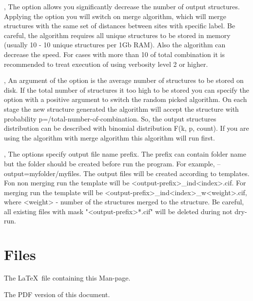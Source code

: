 \documentclass[a4paper,english]{article}
\begin{document}
\begin{Description}
\item[\Opt{-m }, \Opt{--merge-by-distance}]
      The option allows you significantly decrease the number of output structures. Applying the option you will switch on merge algorithm, which will merge structures with the same set of distances between sites with specific label. Be careful, the algorithm requires all unique structures to be stored in memory (usually 10 - 10 unique structures per 1Gb RAM). Also the algorithm can decrease the speed. For cases with more than 10 of  total combination it is recommended to treat execution of  using verbosity level 2 or higher.

\item[\OptArg{-n }{count}, \OptArg{--store-structures=}{count}]
      An argument of the option is the average number of structures to be stored on disk. If the total number of structures it too high to be stored you can specify the option with a positive argument to switch the random picked algorithm. On each stage the new structure generated the algorithm will accept the structure with probability p=/total-number-of-combination. So, the output structures distribution can be described with binomial distribution F(k, p, count). If you are using the algorithm with merge algorithm  this algorithm will run first. 
      
\item[\OptArg{-o }{output-prefix}, \OptArg{--output=}{output-prefix}]
      The options specify output file name prefix. The prefix can contain folder name but the folder should be created before run the program. For example, --output=myfolder/myfiles. The output files will be created according to templates. Fon non merging run the template will be <output-prefix>\_ind<index>.cif. For merging run the template will be <output-prefix>\_ind<index>\_w<weight>.cif, where <weight> - number of the structures merged to the structure. Be careful, all existing files with mask "<output-prefix>*.cif" will be deleted during not dry-run.

\end{Description}

\section{Files}

\begin{Description}\setlength{\itemsep}{0cm}
\item[\File{somthing}] The \LaTeX\ file containing this Man-page.
\item[\URL{1.pdf}] The PDF version of this document.
\end{Description}
\end{document}
